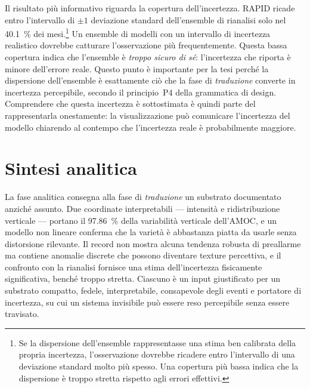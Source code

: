 Il risultato più informativo riguarda la copertura dell'incertezza. RAPID ricade entro l'intervallo di $\pm1$ deviazione standard dell'ensemble di rianalisi solo nel \SI{40.1}{\percent} dei mesi.\footnote{Se la dispersione dell'ensemble rappresentasse una stima ben calibrata della propria incertezza, l'osservazione dovrebbe ricadere entro l'intervallo di una deviazione standard molto più spesso. Una copertura più bassa indica che la dispersione è troppo stretta rispetto agli errori effettivi.} Un ensemble di modelli con un intervallo di incertezza realistico dovrebbe catturare l'osservazione più frequentemente. Questa bassa copertura indica che l'ensemble è \emph{troppo sicuro di sé}: l'incertezza che riporta è minore dell'errore reale. Questo punto è importante per la tesi perché la dispersione dell'ensemble è esattamente ciò che la fase di \emph{traduzione} converte in incertezza percepibile, secondo il principio~P4 della grammatica di design. Comprendere che questa incertezza è sottostimata è quindi parte del rappresentarla onestamente: la visualizzazione può comunicare l'incertezza del modello chiarendo al contempo che l'incertezza reale è probabilmente maggiore.

\section{Sintesi analitica}
\label{sec:detect-summary}

La fase analitica consegna alla fase di \emph{traduzione} un substrato documentato anziché assunto. Due coordinate interpretabili --- intensità e ridistribuzione verticale --- portano il \SI{97.86}{\percent} della variabilità verticale dell'AMOC, e un modello non lineare conferma che la varietà è abbastanza piatta da usarle senza distorsione rilevante. Il record non mostra alcuna tendenza robusta di preallarme ma contiene anomalie discrete che possono diventare texture percettiva, e il confronto con la rianalisi fornisce una stima dell'incertezza fisicamente significativa, benché troppo stretta. Ciascuno è un input giustificato per un substrato compatto, fedele, interpretabile, consapevole degli eventi e portatore di incertezza, su cui un sistema invisibile può essere reso percepibile senza essere travisato.

